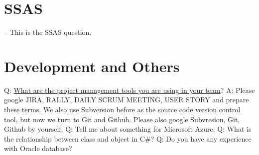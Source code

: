 \documentclass[a4paper,11pt]{article}
\begin{document}
\section{SSAS}
-- This is the SSAS question.

\section{Development and Others}
Q: \ul{What are the project management tools you are using in your team}?\newline
A: Please google JIRA, RALLY, DAILY SCRUM MEETING, USER STORY and prepare these terms. We also use Subversion before as the source code version control tool, but now we turn to Git and Github. Please also google Subvresion, Git, Github by yourself.\newline \newline
\noindent 
Q: Tell me about something for Microsoft Azure. \newline \newline
\noindent 
Q: What is the relationship between class and object in C\#? \newline \newline
\noindent 
Q: Do you have any experience with Oracle database? \newline \newline
\end{document}
